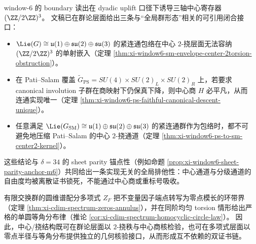 \begin{remark}\label{rem:window6-center-ps-chain-existing}
window-\(6\) 的 boundary 读出在 dyadic uplift 口径下诱导三轴中心寄存器 \((\ZZ/2\ZZ)^3\)。
文稿已在群论层面给出三条与“全局群形态”相关的可引用闭合接口：
\begin{itemize}
  \item \(\Lie(G)\cong \mathfrak u(1)\oplus\mathfrak{su}(2)\oplus\mathfrak{su}(3)\) 的紧连通包络在中心 \(2\)-挠层面无法容纳 \((\ZZ/2\ZZ)^3\) 的单射嵌入（定理 \ref{thm:xi-window6-sm-envelope-center-2torsion-obstruction}）。
  \item 在 Pati--Salam 覆盖 \(\widetilde G_{\mathrm{PS}}=SU(4)\times SU(2)_L\times SU(2)_R\) 上，若要求 canonical involution 子群在商映射下仍保真下降，则中心商 \(H\) 必平凡，从而连通实现唯一（定理 \ref{thm:xi-window6-ps-faithful-canonical-descent-unique}）。
  \item 任意满足 \(\Lie(G_{\mathrm{SM}})\cong \mathfrak u(1)\oplus\mathfrak{su}(2)\oplus\mathfrak{su}(3)\) 的紧连通群作为包络时，都不可避免地压缩 Pati--Salam 的中心 \(2\)-挠通道（定理 \ref{thm:xi-window6-ps-to-sm-center2-kernel}）。
\end{itemize}
这些结论与 \(\delta=34\) 的 sheet parity 锚点性（例如命题 \ref{prop:xi-window6-sheet-parity-anchor-m6}）共同给出一条实现无关的全局排他性：中心通道与分级通道的自由度均被离散证书锁死，不能通过中心商或重标号吸收。
\end{remark}

\begin{remark}\label{rem:window6-torsion-zeros-geometry}
有限交换群的圆维谱配分多项式 \(Z_F\) 把不变量因子端点转写为零点模长的环带界（定理 \ref{thm:xi-cdim-spectrum-zeros-annulus}），并在同阶均匀 torsion 情形给出严格的单圆等角分布律（推论 \ref{cor:xi-cdim-spectrum-homocyclic-circle-law}）。
因此，中心/挠结构既可在群论层面以 \(2\)-挠秩与中心商核检验，也可在多项式层面以零点半径与等角分布提供独立的几何核验接口，从而形成互不依赖的双证书链。
\end{remark}

